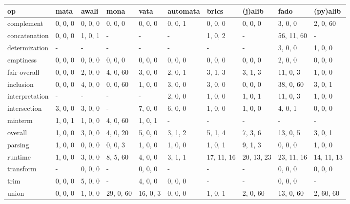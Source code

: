 \begin{tabular}{llllllllll}
\hline
 op             & mata    & awali   & mona      & vata     & automata   & brics      & (j)alib    & fado       & (py)alib   \\
\hline
 complement     & 0, 0, 0 & 0, 0, 0 & 0, 0, 0   & 0, 0, 0  & 0, 0, 1    & 0, 0, 0    & 0, 0, 0    & 3, 0, 0    & 2, 0, 60   \\
 concatenation  & 0, 0, 0 & 1, 0, 1 & -         & -        & -          & 1, 0, 2    & -          & 56, 11, 60 & -          \\
 determization  & -       & -       & -         & -        & -          & -          & -          & 3, 0, 0    & 1, 0, 0    \\
 emptiness      & 0, 0, 0 & 0, 0, 0 & 0, 0, 0   & 0, 0, 0  & 0, 0, 0    & 0, 0, 0    & 0, 0, 0    & 2, 0, 0    & 0, 0, 0    \\
 fair-overall   & 0, 0, 0 & 2, 0, 0 & 4, 0, 60  & 3, 0, 0  & 2, 0, 1    & 3, 1, 3    & 3, 1, 3    & 11, 0, 3   & 1, 0, 0    \\
 inclusion      & 0, 0, 0 & 4, 0, 0 & 0, 0, 60  & 1, 0, 0  & 3, 0, 0    & 3, 0, 0    & 0, 0, 0    & 38, 0, 60  & 3, 0, 1    \\
 interpretation & -       & -       & -         & -        & 2, 0, 0    & 1, 0, 0    & 1, 0, 1    & 11, 0, 3   & 1, 0, 0    \\
 intersection   & 3, 0, 0 & 3, 0, 0 & -         & 7, 0, 0  & 6, 0, 0    & 1, 0, 0    & 1, 0, 0    & 4, 0, 1    & 0, 0, 0    \\
 minterm        & 1, 0, 1 & 1, 0, 0 & 4, 0, 60  & 1, 0, 1  & -          & -          & -          & -          & -          \\
 overall        & 1, 0, 0 & 3, 0, 0 & 4, 0, 20  & 5, 0, 0  & 3, 1, 2    & 5, 1, 4    & 7, 3, 6    & 13, 0, 5   & 3, 0, 1    \\
 parsing        & 1, 0, 0 & 0, 0, 0 & 0, 0, 3   & 1, 0, 0  & 1, 0, 0    & 1, 0, 1    & 9, 1, 3    & 0, 0, 0    & 1, 0, 0    \\
 runtime        & 1, 0, 0 & 3, 0, 0 & 8, 5, 60  & 4, 0, 0  & 3, 1, 1    & 17, 11, 16 & 20, 13, 23 & 23, 11, 16 & 14, 11, 13 \\
 transform      & -       & 0, 0, 0 & -         & 0, 0, 0  & -          & -          & -          & 0, 0, 0    & 0, 0, 0    \\
 trim           & 0, 0, 0 & 5, 0, 0 & -         & 4, 0, 0  & 0, 0, 0    & -          & -          & 0, 0, 0    & -          \\
 union          & 0, 0, 0 & 1, 0, 0 & 29, 0, 60 & 16, 0, 3 & 0, 0, 0    & 1, 0, 1    & 2, 0, 60   & 13, 0, 60  & 2, 60, 60  \\
\hline
\end{tabular}